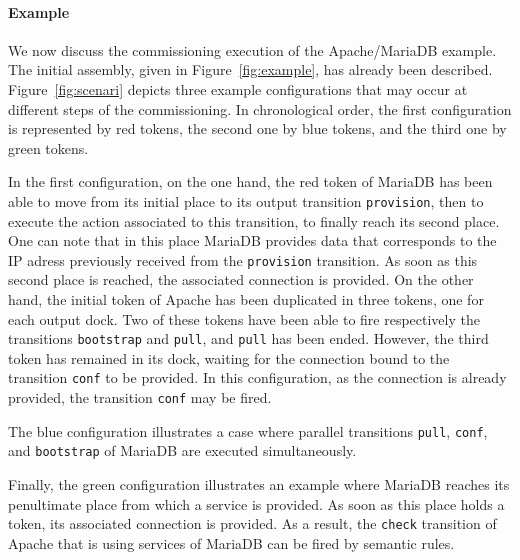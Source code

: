 \paragraph{Example}{
We now discuss the commissioning execution of the Apache/MariaDB
example. The initial assembly, given in Figure~\ref{fig:example}, has
already been described. Figure~\ref{fig:scenari} depicts three example
configurations that may occur at different steps of the
commissioning. In chronological order, the first configuration is
represented by red tokens, the second one by blue tokens, and the
third one by green tokens.

In the first configuration, on the one hand, the red token of MariaDB
has been able to move from its initial place to its output transition
\texttt{provision}, then to execute the action associated to this
transition, to finally reach its second place. One can note that in
this place MariaDB provides data that corresponds to the IP adress
previously received from the \texttt{provision} transition. As soon as this
second place is reached, the associated connection is provided. On the
other hand, the initial token of Apache has been duplicated in three
tokens, one for each output dock. Two of these tokens have been able
to fire respectively the transitions \texttt{bootstrap} and
\texttt{pull}, and \texttt{pull} has been ended. However, the third
token has remained in its dock, waiting for the connection bound to
the transition \texttt{conf} to be provided. In this configuration, as
the connection is already provided, the transition \texttt{conf} may be fired.

The blue configuration illustrates a case where parallel transitions
\texttt{pull}, \texttt{conf}, and \texttt{bootstrap} of MariaDB are
executed simultaneously.

Finally, the green configuration illustrates an example where MariaDB
reaches its penultimate place from which a service is provided. As
soon as this place holds a token, its associated connection is
provided. As a result, the \texttt{check} transition of Apache that is
using services of MariaDB can be fired by semantic rules.}
